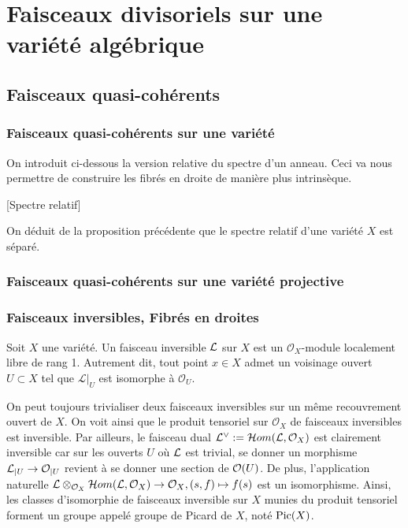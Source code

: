 \chapter{Faisceaux divisoriels sur une variété algébrique}


\section{Faisceaux quasi-cohérents}

\subsection{Faisceaux quasi-cohérents sur une variété}

On introduit ci-dessous la version relative du spectre d'un anneau. Ceci va nous permettre de construire les fibrés en droite de manière plus intrinsèque.

\begin{cons}\label{relspec}[Spectre relatif]

\end{cons}

On déduit de la proposition précédente que le spectre relatif d'une variété $X$ est séparé.

\subsection{Faisceaux quasi-cohérents sur une variété projective}

\subsection{Faisceaux inversibles, Fibrés en droites}
\begin{defn}
Soit $X$ une variété. Un faisceau inversible $\mathcal{L}$ sur $X$ est un $\mathcal{O}_X$-module localement libre de rang 1. Autrement dit, tout point $x\in X$ admet un voisinage ouvert $U \subset X$ tel que ${\mathcal L}|_U$ est isomorphe à ${\mathcal O}_U$.
\end{defn}

On peut toujours trivialiser deux faisceaux inversibles sur un même recouvrement ouvert de $X$. On voit ainsi que le produit tensoriel sur $\mathcal{O}_X$ de faisceaux inversibles est inversible. Par ailleurs, le faisceau dual $\mathcal{L}^\vee:=\mathcal{H} om(\mathcal{L},\mathcal{O}_X)$ est clairement inversible car sur les ouverts $U$ où $\mathcal{L}$ est trivial, se donner un morphisme $\mathcal{L}_{|U}\rightarrow\mathcal{O}_{|U}$ revient à se donner une section de $\mathcal{O}(U)$. De plus, l'application naturelle $\mathcal{L}\otimes_{\mathcal{O}_X} \mathcal{H} om(\mathcal{L},\mathcal{O}_X)\rightarrow \mathcal{O}_X, (s,f)\mapsto f(s)$ est un isomorphisme. Ainsi, les classes d'isomorphie de faisceaux inversible sur $X$ munies du produit tensoriel forment un groupe appelé groupe de Picard de $X$, noté $\operatorname{Pic}(X)$. 

